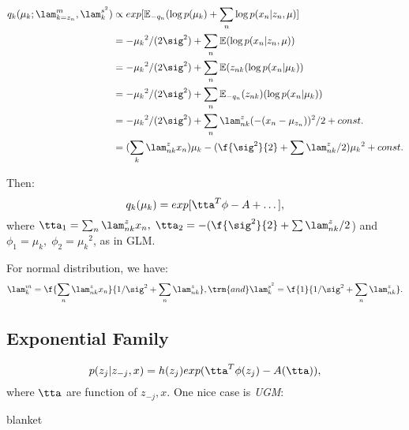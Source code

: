 \documentclass{article}
\begin{document}
\begin{align*}
q_k(\mu_k; \lam_{k=z_n}^m, \lam_k^{s^2}) &\propto exp [\E_{-q_n} (\log p(\mu_k) + \sum_n \log p(x_n|z_n,\mu)] \\
&= -\mu_k{}^2 / (2 \sig^2) + \sum_n \E(\log p(x_n|z_n,\mu)) \\
&= -\mu_k{}^2 / (2 \sig^2) + \sum_n \E(z_{nk} (\log p(x_n|\mu_k)) \\
&= -\mu_k{}^2 / (2 \sig^2) + \sum_n \E_{-q_n}(z_{nk}) (\log p(x_n|\mu_k)) \\
&= -\mu_k{}^2 / (2 \sig^2) + \sum_n \lam_{nk}^z  (-(x_n - \mu_{z_n}))^2 / 2 + const. \\
&= (\sum_k \lam_{nk}^z x_n)\mu_k - (\f{\sig^2}{2} + \sum \lam_{nk}^z / 2) \mu_k{}^2 + const. 
\end{align*}

Then:
\[ q_k(\mu_k) = exp[ \tta ^T \phi - A + \dots ], \]
where $\tta_1 = \sum_n \lam_{nk}^z x_n, \; \tta_2 = -(\f{\sig^2}{2} + \sum \lam_{nk}^z / 2$) and $\phi_1 = \mu_k, \; \phi_2 = \mu_k{}^2$, as in GLM.

For normal distribution, we have:
\[ \lam_k^m = \f{\sum_n \lam_{nk}^z x_n}{1/\sig^2 + \sum_n \lam_{nk}^z}, \trm{ and } \lam_k^{s^2} = \f{1}{1/\sig^2 + \sum_n \lam_{nk}^z}. \]

\subsection{Exponential Family}

\[ p(z_j|z_{-j},x) = h(z_j) exp(\tta^T\phi(z_j) - A(\tta)), \]
where $\tta$ are function of $z_{-j}, x$. One nice case is {\em UGM}:

\begin{center}
\end{center}
\begin{center}
blanket
\end{center}
\end{document}
